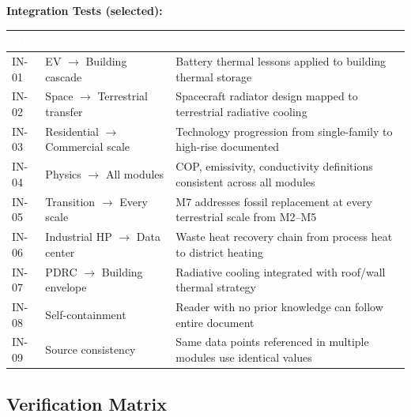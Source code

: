 \documentclass[11pt,letterpaper]{article}
\newcommand{\tableheader}[1]{\textbf{\sffamily\textcolor{white}{#1}}}
\begin{document}
\textbf{Integration Tests (selected):}

\begin{center}
\begin{tabularx}{\textwidth}{C{1.2cm}L{3cm}X}
\toprule
{}
\tableheader{ID} & \tableheader{Verifies} & \tableheader{Expected} \\
\midrule
IN-01 & EV $\rightarrow$ Building cascade & Battery thermal lessons applied to building thermal storage \\
IN-02 & Space $\rightarrow$ Terrestrial transfer & Spacecraft radiator design mapped to terrestrial radiative cooling \\
IN-03 & Residential $\rightarrow$ Commercial scale & Technology progression from single-family to high-rise documented \\
IN-04 & Physics $\rightarrow$ All modules & COP, emissivity, conductivity definitions consistent across all modules \\
IN-05 & Transition $\rightarrow$ Every scale & M7 addresses fossil replacement at every terrestrial scale from M2--M5 \\
IN-06 & Industrial HP $\rightarrow$ Data center & Waste heat recovery chain from process heat to district heating \\
IN-07 & PDRC $\rightarrow$ Building envelope & Radiative cooling integrated with roof/wall thermal strategy \\
IN-08 & Self-containment & Reader with no prior knowledge can follow entire document \\
IN-09 & Source consistency & Same data points referenced in multiple modules use identical values \\
\bottomrule
\end{tabularx}
\end{center}

\subsection{Verification Matrix}
\end{document}
